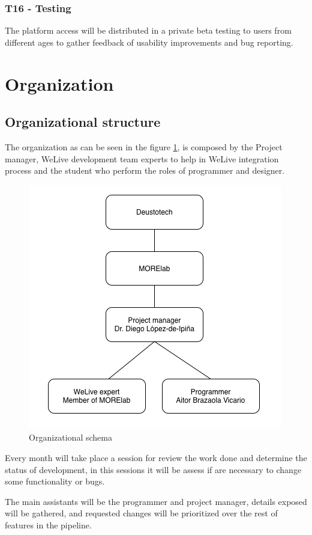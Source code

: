 \documentclass{DeustoFDP}
\begin{document}
\subsubsection{T16 - Testing}
The platform access will be distributed in a private beta testing to users from different ages to gather feedback of usability improvements and bug reporting. 

\section{Organization}
\subsection{Organizational structure}
The organization as can be seen in the figure \ref{fig:esquemaorganizacion}, is composed by the Project manager, WeLive development team experts to help in WeLive integration process and the student who perform the roles of programmer and designer.

\begin{figure}[h]
	\centering
	\includegraphics[width=0.7\linewidth]{fig/esquemaorganizacion}
	\caption[Organizational schema]{Organizational schema}
	\label{fig:esquemaorganizacion}
\end{figure}

Every month will take place a session for review the work done and determine the status of development, in this sessions it will be assess if are necessary to change some functionality or bugs.

The main assistants will be the programmer and project manager, details exposed will be gathered, and requested changes will be prioritized over the rest of features in the pipeline.
\end{document}
